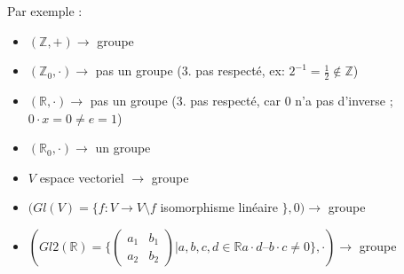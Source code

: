 \documentclass[11pt]{article}
\begin{document}
			Par exemple :
			\begin{itemize}
				\item $(\mathbb Z, +) \rightarrow$ groupe
				\item $(\mathbb Z_0, \cdot) \rightarrow$ pas un groupe (3. pas respecté, ex: $2^{-1} = \frac{1}{2} \not\in \mathbb Z$)
				\item $(\mathbb R, \cdot) \rightarrow$ pas un groupe (3.  pas respecté, car 0 n'a pas d'inverse ; $0 \cdot x = 0 \neq e = 1$)
				\item $(\mathbb R_0, \cdot) \rightarrow$ un groupe
				\item $V$ espace vectoriel $\rightarrow$ groupe
				\item $(Gl(V) = \{f : V \rightarrow V \setminus f$ isomorphisme linéaire $\}, 0) \rightarrow$ groupe
				\item $(Gl2(\mathbb R) = \{
					\begin{pmatrix}
  						a_1 & b_1 \\
						a_2 & b_2 
					\end{pmatrix} 
					| a, b, c, d \in \mathbb R  a \cdot d – b \cdot c \neq 0\}, \cdot) \rightarrow$ groupe
			\end{itemize}






		
\end{document}
